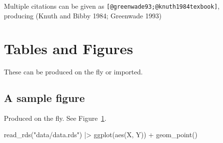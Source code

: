 \documentclass[
  sn-nature,
]{sn-jnl}
\newenvironment{Shaded}{\begin{snugshade}}{\end{snugshade}}
\newcommand{\FunctionTok}[1]{\textcolor[rgb]{0.28,0.35,0.67}{#1}}
\newcommand{\NormalTok}[1]{\textcolor[rgb]{0.00,0.23,0.31}{#1}}
\newcommand{\SpecialCharTok}[1]{\textcolor[rgb]{0.37,0.37,0.37}{#1}}
\newcommand{\StringTok}[1]{\textcolor[rgb]{0.13,0.47,0.30}{#1}}
\begin{document}
Multiple citations can be given as
\texttt{{[}@greenwade93;@knuth1984texbook{]}}, producing (Knuth and
Bibby 1984; Greenwade 1993)

\newpage

\section{Tables and Figures}\label{tables-and-figures}

These can be produced on the fly or imported.

\subsection{A sample figure}\label{a-sample-figure}

Produced on the fly. See Figure~\ref{fig-1}.

\begin{Shaded}
\begin{Highlighting}[]
\FunctionTok{read\_rds}\NormalTok{(}\StringTok{"data/data.rds"}\NormalTok{) }\SpecialCharTok{|\textgreater{}}
  \FunctionTok{ggplot}\NormalTok{(}\FunctionTok{aes}\NormalTok{(X, Y)) }\SpecialCharTok{+} \FunctionTok{geom\_point}\NormalTok{()}
\end{Highlighting}
\end{Shaded}

\begin{figure}[H]


\caption{\label{fig-1}}

\end{figure}%
\end{document}
